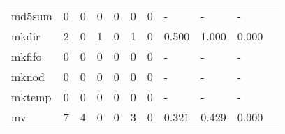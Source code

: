 \begin{longtable}{lp{1.2cm}p{1.2cm}p{1.2cm}p{1.2cm}p{1.2cm}p{1.2cm}p{1.2cm}p{1.2cm}p{1.2cm}p{1.2cm}}
md5sum    &                                     0 &                                                  0 &                                                0 &                                               0 &                                                0 &                                              0 &                                             - &                                                  - &                                                  - \\
mkdir     &                                     2 &                                                  0 &                                                1 &                                               0 &                                                1 &                                              0 &                                         0.500 &                                              1.000 &                                              0.000 \\
mkfifo    &                                     0 &                                                  0 &                                                0 &                                               0 &                                                0 &                                              0 &                                             - &                                                  - &                                                  - \\
mknod     &                                     0 &                                                  0 &                                                0 &                                               0 &                                                0 &                                              0 &                                             - &                                                  - &                                                  - \\
mktemp    &                                     0 &                                                  0 &                                                0 &                                               0 &                                                0 &                                              0 &                                             - &                                                  - &                                                  - \\
mv        &                                     7 &                                                  4 &                                                0 &                                               0 &                                                3 &                                              0 &                                         0.321 &                                              0.429 &                                              0.000 \\

\end{longtable}
